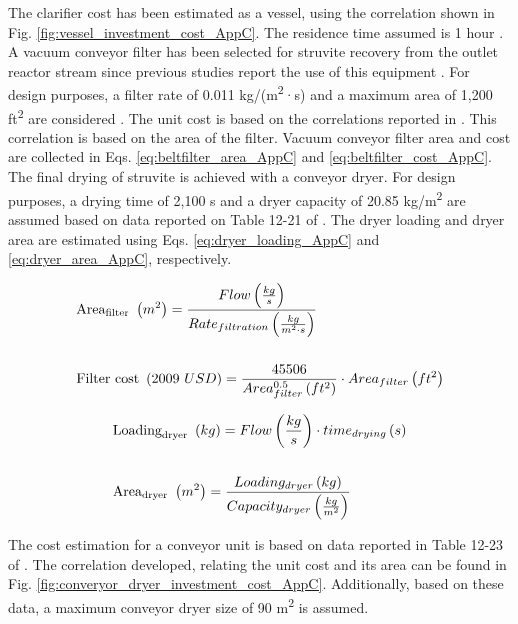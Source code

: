 \begin{refsection}[referencesCh4]
The clarifier cost has been estimated as a vessel, using the correlation shown in Fig. \ref{fig:vessel_investment_cost_AppC}. The residence time assumed is 1 hour \citep{ehbrecht_p-recovery_2011}. A vacuum conveyor filter has been selected for struvite recovery from the outlet reactor stream since previous studies report the use of this equipment \citep{Matynia}. For design purposes, a filter rate of 0.011 kg/(m\textsuperscript{2}·s) and a maximum area of 1,200 ft\textsuperscript{2} are considered \citep{Walas}. The unit cost is based on the correlations reported in \citet{Walas}. This correlation is based on the area of the filter. Vacuum conveyor filter area and cost are collected in Eqs. \ref{eq:beltfilter_area_AppC} and \ref{eq:beltfilter_cost_AppC}. The final drying of struvite is achieved with a conveyor dryer. For design purposes, a drying time of 2,100 s and a dryer capacity of 20.85 kg/m\textsuperscript{2} are assumed based on data reported on Table 12-21 of \citet{Perry}. The dryer loading and dryer area are estimated using Eqs. \ref{eq:dryer_loading_AppC} and \ref{eq:dryer_area_AppC}, respectively.

\begin{align} 
& \text{\text{Area}}_{\text{filter}} \ \left(m^{2}\right) = \frac{Flow \left( \frac{kg}{s} \right)}{Rate_{filtration} \left( \frac{kg}{m^{2} \cdot s} \right)} \label{eq:beltfilter_area_AppC} \\ \nonumber\\
& \text{Filter cost} \ \left(2009 \ USD\right) = \frac{45506}{Area_{filter}^{0.5} \left( ft^{2} \right)} \cdot Area_{filter} \left( ft^{2} \right) \label{eq:beltfilter_cost_AppC}
\end{align}


\begin{align} 
& \text{\text{Loading}}_{\text{dryer}} \ \left(kg\right) = Flow \left( \frac{kg}{s} \right) \cdot time_{drying} \left( s\right) \label{eq:dryer_loading_AppC} \\
\nonumber\\
& \text{\text{Area}}_{\text{dryer}} \ \left(m^2\right) = \frac{Loading_{dryer}\left(kg\right)}{Capacity_{dryer} \left(\frac{kg}{m^2}\right)} \label{eq:dryer_area_AppC}
\end{align}

The cost estimation for a conveyor unit is based on data reported in Table 12-23 of \citet{Perry}. The correlation developed, relating the unit cost and its area can be found in Fig. \ref{fig:converyor_dryer_investment_cost_AppC}. Additionally, based on these data, a maximum conveyor dryer size of 90 m\textsuperscript{2} is assumed.


\end{refsection}
